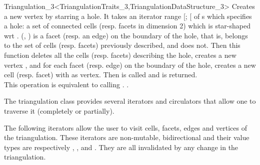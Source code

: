\begin{ccRefClass}{Triangulation_3<TriangulationTraits_3,TriangulationDataStructure_3>}
{Creates a new vertex by starring a hole.  It takes an iterator range
[; [ of s which specifies
a hole: a set of connected cells (resp. facets in dimension 2) which is
star-shaped wrt .
(, ) is a facet (resp. an edge) on the boundary of the hole,
that is,  belongs to the set of cells (resp.  facets) previously
described, and  does not.  Then this function deletes
all the cells (resp. facets) describing the hole, creates a new vertex
, and for each facet (resp. edge) on the boundary of the hole, creates
a new cell (resp. facet) with  as vertex.  Then 
is called and  is returned.\\
This operation is equivalent to calling
.
.}


The triangulation class provides several iterators and circulators
that allow one to traverse it (completely or partially).


The following iterators allow the user to visit cells,
facets, edges and vertices of the
triangulation. These iterators are non-mutable, bidirectional and
their value types are respectively , , 
and . They are all invalidated by any change in the
triangulation. 


\end{ccRefClass}
